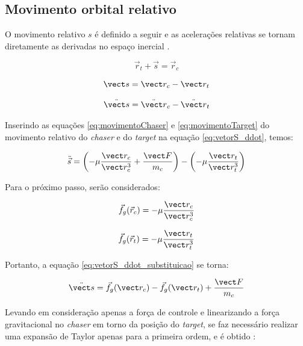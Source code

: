 \subsection{Movimento orbital relativo}

O movimento relativo $s$ é definido a seguir e as acelerações relativas se tornam diretamente as derivadas no espaço inercial \cite{fehse2003}.

\begin{equation}
\vec r_t + \vec s = \vec r_c
\end{equation}

\begin{equation}
\label{eq:vetorS}
\vect s = \vect r_{c} - \vect r_{t}
\end{equation}

\begin{equation}
\label{eq:vetorS_ddot}
\ddot{\vect s} = \ddot{\vect r}_{c} - \ddot{\vect r}_{t}
\end{equation}

Inserindo as equações \eqref{eq:movimentoChaser} e \eqref{eq:movimentoTarget} do movimento relativo do \emph{chaser} e do \emph{target} na equação \eqref{eq:vetorS_ddot}, temos:

\begin{equation}
\label{eq:vetorS_ddot_substituicao}
\ddot{\vec s} = \left(-\mu \frac{\vect r_c}{\vect r_{c}^3} + \frac{\vect F}{m_c}\right) - \left(-\mu \frac{\vect r_t}{\vect r_t^3}\right)
\end{equation}

Para o próximo passo, serão considerados:

\begin{equation}
    \label{eq:fg_rc}
\vec f_g(\vec r_c) = -\mu \frac{\vect r_c}{\vect r_{c}^3}
\end{equation}

\begin{equation}
    \label{eq:fg_rt}
\vec f_g(\vec r_t) = -\mu \frac{\vect r_t}{\vect r_{t}^3}
\end{equation}

Portanto, a equação \eqref{eq:vetorS_ddot_substituicao} se torna:

\begin{equation}
\label{eq:fg_rc_fg_rt}
\ddot{\vect s} = \vec f_g(\vect r_c) - \vec f_g(\vect r_t) + \frac{\vect F}{m_c}
\end{equation}

Levando em consideração apenas a força de controle e linearizando a força gravitacional no \emph{chaser} em torno da posição do \emph{target}, se faz necessário realizar uma expansão de Taylor apenas para a primeira ordem, e é obtido \cite{arantes2011}:

